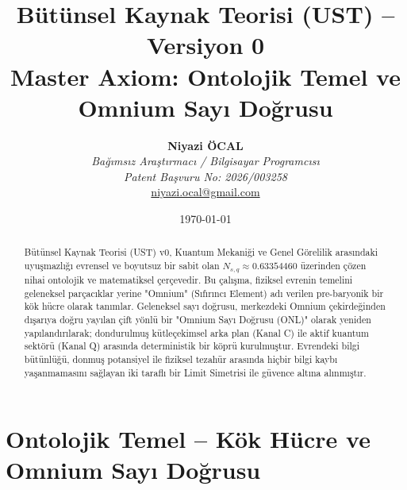 





\usepackage{amsmath, amssymb, amsfonts}
\usepackage{geometry}
\usepackage{hyperref}
\usepackage{setspace}

\geometry{
    a4paper,
    left=2.5cm,
    right=2.5cm,
    top=3cm,
    bottom=3cm
}

\title{\textbf{Bütünsel Kaynak Teorisi (UST) -- Versiyon 0}\\ 
\Large Master Axiom: Ontolojik Temel ve Omnium Sayı Doğrusu}
\author{
    \textbf{Niyazi ÖCAL} \\ 
    \textit{Bağımsız Araştırmacı / Bilgisayar Programcısı} \\
    \textit{Patent Başvuru No: 2026/003258} \\
    \href{mailto:niyazi.ocal@gmail.com}{niyazi.ocal@gmail.com}
}
\date{\today}



\maketitle

\begin{abstract}
Bütünsel Kaynak Teorisi (UST) v0, Kuantum Mekaniği ve Genel Görelilik arasındaki uyuşmazlığı evrensel ve boyutsuz bir sabit olan $N_{s,q} \approx 0.63354460$ üzerinden çözen nihai ontolojik ve matematiksel çerçevedir. Bu çalışma, fiziksel evrenin temelini geleneksel parçacıklar yerine "Omnium" (Sıfırıncı Element) adı verilen pre-baryonik bir kök hücre olarak tanımlar. Geleneksel sayı doğrusu, merkezdeki Omnium çekirdeğinden dışarıya doğru yayılan çift yönlü bir "Omnium Sayı Doğrusu (ONL)" olarak yeniden yapılandırılarak; dondurulmuş kütleçekimsel arka plan (Kanal C) ile aktif kuantum sektörü (Kanal Q) arasında deterministik bir köprü kurulmuştur. Evrendeki bilgi bütünlüğü, donmuş potansiyel ile fiziksel tezahür arasında hiçbir bilgi kaybı yaşanmamasını sağlayan iki taraflı bir Limit Simetrisi ile güvence altına alınmıştır.
\end{abstract}

\vspace{1cm}

\section{Ontolojik Temel – Kök Hücre ve Omnium Sayı Doğrusu}

